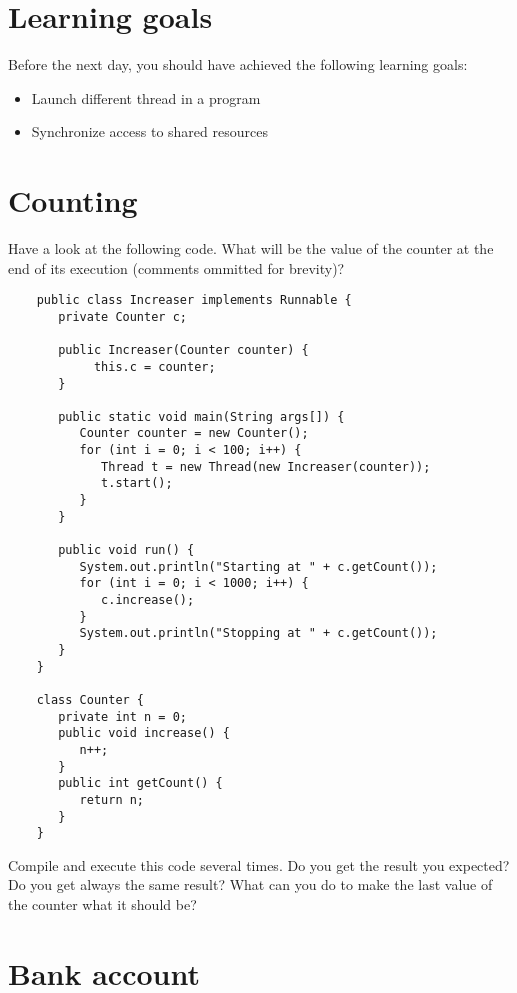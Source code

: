 \documentclass{article}
\begin{document}
\section*{Learning goals}
\label{sec:learning-goals}

Before the next day, you should have achieved the following learning
goals: 

\begin{itemize}
\item Launch different thread in a program
\item Synchronize access to shared resources
\end{itemize}

\section{Counting}
\label{sec:counter}

Have a look at the following code. What will be the value of the
counter at the end of its execution (comments ommitted for brevity)? 

\begin{verbatim}
    public class Increaser implements Runnable {
       private Counter c;
    
       public Increaser(Counter counter) {
            this.c = counter;
       }
    
       public static void main(String args[]) {
          Counter counter = new Counter();
          for (int i = 0; i < 100; i++) {
             Thread t = new Thread(new Increaser(counter));
             t.start();
          }
       }
    
       public void run() {
          System.out.println("Starting at " + c.getCount());
          for (int i = 0; i < 1000; i++) {
             c.increase();
          }
          System.out.println("Stopping at " + c.getCount());
       }
    }
    
    class Counter {
       private int n = 0;
       public void increase() {
          n++;
       }
       public int getCount() {
          return n;
       }
    }
\end{verbatim}

Compile and execute this code several times. Do you get the result you
expected? Do you get always the same result? What can you do to make
the last value of the counter what it should be?

\section{Bank account}
\label{sec:bank-account}
\end{document}

